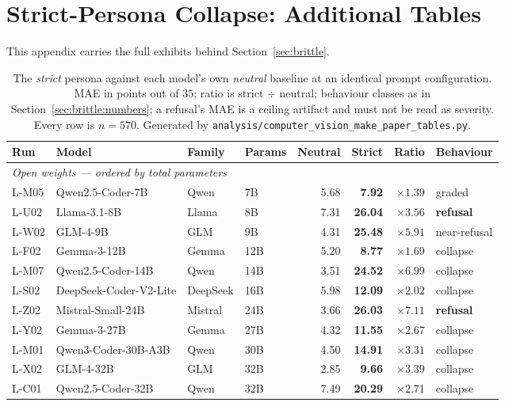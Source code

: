 \clearpage
\section{Strict-Persona Collapse: Additional Tables}
\label{app:brittle}

This appendix carries the full exhibits behind Section~\ref{sec:brittle}.

\begin{table}[t]
\centering
\caption{The \emph{strict} persona against each model's own \emph{neutral} baseline at an identical prompt configuration. MAE in points out of $35$; ratio is strict $\div$ neutral; behaviour classes as in Section~\ref{sec:brittle:numbers}; a refusal's MAE is a ceiling artifact and must not be read as severity. Every row is $n = 570$. Generated by \texttt{analysis/computer\_vision\_make\_paper\_tables.py}.}
\label{tab:brittle}
\small
\begin{tabular}{llllrrrl}
\toprule
Run & Model & Family & Params & Neutral & \textbf{Strict} & Ratio & Behaviour \\
\midrule
\multicolumn{8}{l}{\emph{Open weights --- ordered by total parameters}} \\
L-M05 & Qwen2.5-Coder-7B & Qwen & 7B & 5.68 & \textbf{7.92} & $\times 1.39$ & graded \\
L-U02 & Llama-3.1-8B & Llama & 8B & 7.31 & \textbf{26.04} & $\times 3.56$ & \textbf{refusal} \\
L-W02 & GLM-4-9B & GLM & 9B & 4.31 & \textbf{25.48} & $\times 5.91$ & near-refusal \\
L-F02 & Gemma-3-12B & Gemma & 12B & 5.20 & \textbf{8.77} & $\times 1.69$ & collapse \\
L-M07 & Qwen2.5-Coder-14B & Qwen & 14B & 3.51 & \textbf{24.52} & $\times 6.99$ & collapse \\
L-S02 & DeepSeek-Coder-V2-Lite & DeepSeek & 16B & 5.98 & \textbf{12.09} & $\times 2.02$ & collapse \\
L-Z02 & Mistral-Small-24B & Mistral & 24B & 3.66 & \textbf{26.03} & $\times 7.11$ & \textbf{refusal} \\
L-Y02 & Gemma-3-27B & Gemma & 27B & 4.32 & \textbf{11.55} & $\times 2.67$ & collapse \\
L-M01 & Qwen3-Coder-30B-A3B & Qwen & 30B & 4.50 & \textbf{14.91} & $\times 3.31$ & collapse \\
L-X02 & GLM-4-32B & GLM & 32B & 2.85 & \textbf{9.66} & $\times 3.39$ & collapse \\
L-C01 & Qwen2.5-Coder-32B & Qwen & 32B & 7.49 & \textbf{20.29} & $\times 2.71$ & collapse \\

\end{tabular}
\end{table}
